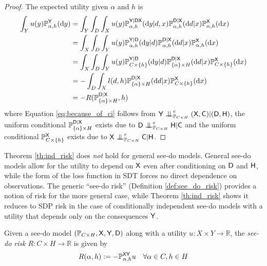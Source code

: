 \begin{proof}
The expected utility given $\alpha$ and $h$ is
\begin{align}
    \int_Y u(y)\mathbb{P}_{\alpha,h}^{\mathsf{Y}}(\mathrm{d}y) &= \int_Y  \int_D \int_{X} u(y)\mathbb{P}_{\alpha,h}^{\mathsf{Y}|\mathsf{DX}}(\mathrm{d}y|d,x)\mathbb{P}_{\alpha,h}^{\mathsf{D}|\mathsf{X}}(\mathrm{d}d|x)\mathbb{P}_{\alpha,h}^{\mathsf{X}}(\mathrm{d}x) \\
    &= \int_X  \int_D \int_{Y} u(y) \mathbb{P}_{\alpha,h}^{\mathsf{Y}|\mathsf{D}}(\mathrm{d}y|d)\mathbb{P}_{\alpha,h}^{\mathsf{D}|\mathsf{X}}(\mathrm{d}d|x)\mathbb{P}_{\alpha,h}^{\mathsf{X}}(\mathrm{d}x)\label{eq:because_of_ci}\\
    &= \int_{X} \int_D \int_Y u(y) \mathbb{P}_{C\times\{h\}}^{\mathsf{Y}|\mathsf{D}}(\mathrm{d}y|d)\mathbb{P}_{\{\alpha\}\times H}^{\mathsf{D}|\mathsf{X}}(\mathrm{d}d|x)\mathbb{P}_{C\times\{h\}}^{\mathsf{X}}(\mathrm{d}x)\\
     &= -\int_D\int_X l(d,h)\mathbb{P}_{\{\alpha\}\times H}^{\mathsf{D}|\mathsf{X}}(\mathrm{d}d|x)\mathbb{P}_{C\times\{h\}}^{\mathsf{X}}(\mathrm{d}x)\\
    &= -R(\mathbb{P}_{\{\alpha\}\times H}^{\mathsf{D}|\mathsf{X}},h)
\end{align}
where Equation \ref{eq:because_of_ci} follows from $\RV{Y}\CI^e_{\prob{P}_{C\times H}} (\RV{X,C})|(\RV{D},\RV{H})$, the uniform conditional $\mathbb{P}_{\{\alpha\}\times H}^{\mathsf{D}|\mathsf{X}}$ exists due to $\RV{D}\CI^e_{\prob{P}_{C\times H}} \RV{H}|\RV{C}$ and the uniform conditional $\mathbb{P}_{C\times\{h\}}^{\mathsf{X}}$ exists due to $\RV{X}\CI^e_{\prob{P}_{C\times H}} \RV{C}|\RV{H}$.
\end{proof}

Theorem \ref{th:ind_risk} does \emph{not} hold for general see-do models. General see-do models allow for the utility to depend on $\mathsf{X}$ even after conditioning on $\mathsf{D}$ and $\mathsf{H}$, while the form of the loss function in SDT forces no direct dependence on observations. The generic ``see-do risk'' (Definition \ref{def:see_do_risk}) provides a notion of risk for the more general case, while Theorem \ref{th:ind_risk} shows it reduces to SDP risk in the case of conditionally independent see-do models with a utility that depends only on the consequences $\mathsf{Y}$.
\begin{definition}\label{def:see_do_risk}
Given a see-do model $(\mathbb{P}_{C\times H}, \mathsf{X},\mathsf{Y},\mathsf{D})$ along with a utility $u:X\times Y\to \mathbb{R}$, the \emph{see-do risk} $R:C\times H\to \mathbb{R}$ is given by
\begin{align}
    R(\alpha,h) &:= -\mathbb{P}_{\alpha,h}^{\mathsf{XY}}u&\forall \alpha\in C,h\in H
\end{align}
\end{definition}

